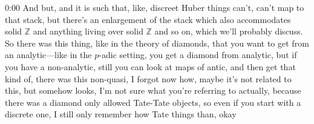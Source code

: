 \begin{unfinished}{0:00}
And but, and it is such that, like, discreet Huber things can't, can't map to that stack, but there's an enlargement of the stack which also accommodates solid $\mathbb{Z}$ and anything living over solid $\mathbb{Z}$ and so on, which we'll probably discuss. So there was this thing, like in the theory of diamonds, that you want to get from an analytic---like in the $p$-adic setting, you get a diamond from analytic, but if you have a non-analytic, still you can look at maps of antic, and then get that kind of, there was this non-quasi, I forgot now how, maybe it's not related to this, but somehow looks, I'm not sure what you're referring to actually, because there was a diamond only allowed Tate-Tate objects, so even if you start with a discrete one, I still only remember how Tate things than, okay

\end{unfinished}